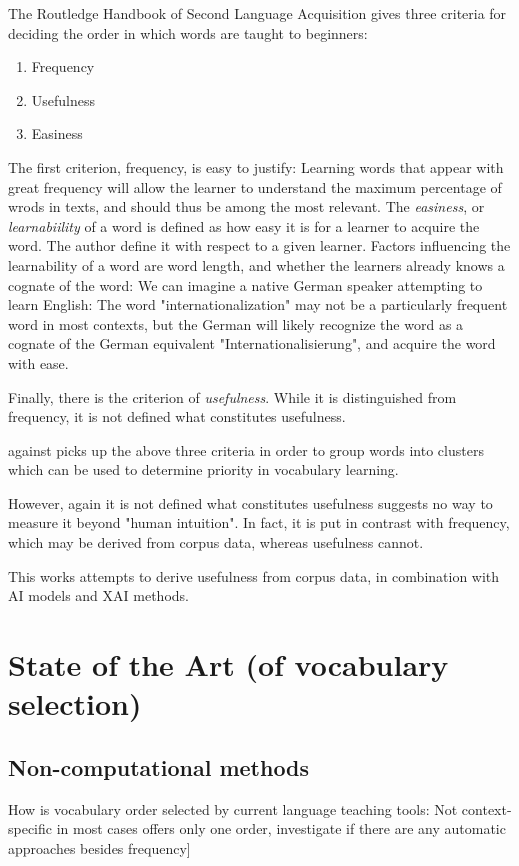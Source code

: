 The Routledge Handbook of Second Language Acquisition  gives three criteria for deciding the order in which words are taught to beginners:
\begin{enumerate}
	\item Frequency
	\item Usefulness
	\item Easiness
\end{enumerate}
The first criterion, frequency, is easy to justify:
Learning words that appear with great frequency will allow the learner to understand the maximum percentage of wrods in texts, and should thus be among the most relevant.
The \textit{easiness}, or \textit{learnabiility} of a word is defined as how easy it is for a learner to acquire the word.
The author define it with respect to a given learner.
Factors influencing the learnability of a word are word length, and whether the learners already knows a cognate of the word:
We can imagine a native German speaker attempting to learn English:
The word "internationalization" may not be a particularly frequent word in most contexts, but the German will likely recognize the word as a cognate of the German equivalent "Internationalisierung", and acquire the word with ease.

Finally, there is the criterion of \textit{usefulness}.
While it is distinguished from frequency, it is not defined what constitutes usefulness.

 against picks up the above three criteria in order to group words into clusters which can be used to determine priority in vocabulary learning.

However, again it is not defined what constitutes usefulness suggests no way to measure it beyond "human intuition".
In fact, it is put in contrast with frequency, which may be derived from corpus data, whereas usefulness cannot.

This works attempts to derive usefulness from corpus data, in combination with AI models and XAI methods.



\section{State of the Art (of vocabulary selection)}
\subsection{Non-computational methods}
How is vocabulary order selected by current language teaching tools:
Not context-specific in most cases
offers only one order,
investigate if there are any automatic approaches besides frequency]


